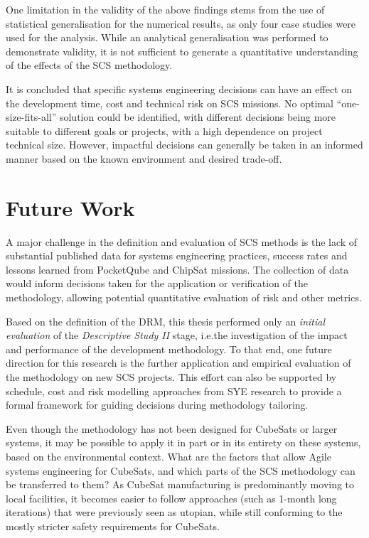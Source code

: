\documentclass[a4paper,nobib,justified,final]{tufte-book}
\begin{document}
\begin{fullwidth}
One limitation in the validity of the above findings stems from the use of statistical generalisation for the numerical results, as only four case studies were used for the analysis. While an analytical generalisation was performed to demonstrate validity, it is not sufficient to generate a quantitative understanding of the effects of the \acs{SCS} methodology.

It is concluded that specific systems engineering decisions can have an effect on the development time, cost and technical risk on \acs{SCS} missions. No optimal ``one-size-fits-all'' solution could be identified, with different decisions being more suitable to different goals or projects, with a high dependence on project technical size. However, impactful decisions can generally be taken in an informed manner based on the known environment and desired trade-off.

\section{Future Work}

A major challenge in the definition and evaluation of \acs{SCS} methods is the lack of substantial published data for systems engineering practices, success rates and lessons learned from PocketQube and ChipSat missions. The collection of data would inform decisions taken for the application or verification of the methodology, allowing potential quantitative evaluation of risk and other metrics.

Based on the definition of the \acl{DRM}, this thesis performed only an \emph{initial evaluation} of the \emph{Descriptive Study II} stage, i.e.\@ the investigation of the impact and performance of the development methodology.
To that end, one future direction for this research is the further application and empirical evaluation of the methodology on new \acs{SCS} projects. This effort can also be supported by schedule, cost and risk modelling approaches from \acl{SYE} research %
to provide a formal framework for guiding decisions during methodology tailoring.

Even though the methodology has not been designed for CubeSats or larger systems, it may be possible to apply it in part or in its entirety on these systems, based on the environmental context. What are the factors that allow Agile systems engineering for CubeSats, and which parts of the \acs{SCS} methodology can be transferred to them? As CubeSat manufacturing is predominantly moving to local facilities, it becomes easier to follow approaches (such as 1-month long iterations) that were previously seen as utopian, while still conforming to the mostly stricter safety requirements for CubeSats.


\end{fullwidth}
\end{document}
